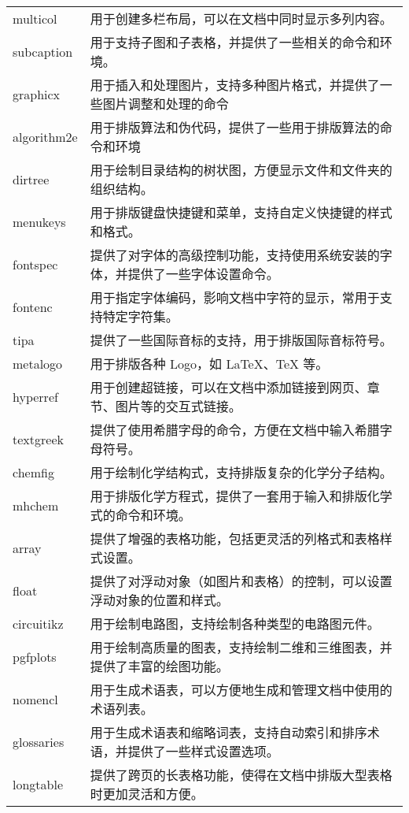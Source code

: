\begin{center}
\begin{longtable}{C{1.8cm}|L{13cm}}
		multicol&用于创建多栏布局，可以在文档中同时显示多列内容。\\
		subcaption&用于支持子图和子表格，并提供了一些相关的命令和环境。\\
		graphicx&用于插入和处理图片，支持多种图片格式，并提供了一些图片调整和处理的命令\\
		algorithm2e&用于排版算法和伪代码，提供了一些用于排版算法的命令和环境\\
		dirtree&用于绘制目录结构的树状图，方便显示文件和文件夹的组织结构。\\
		menukeys&用于排版键盘快捷键和菜单，支持自定义快捷键的样式和格式。\\
		fontspec&提供了对字体的高级控制功能，支持使用系统安装的字体，并提供了一些字体设置命令。\\
		fontenc&用于指定字体编码，影响文档中字符的显示，常用于支持特定字符集。\\
		tipa&提供了一些国际音标的支持，用于排版国际音标符号。\\
		metalogo&用于排版各种 Logo，如 LaTeX、TeX 等。\\
		hyperref&用于创建超链接，可以在文档中添加链接到网页、章节、图片等的交互式链接。\\
		textgreek&提供了使用希腊字母的命令，方便在文档中输入希腊字母符号。\\
		chemfig&用于绘制化学结构式，支持排版复杂的化学分子结构。\\
		mhchem&用于排版化学方程式，提供了一套用于输入和排版化学式的命令和环境。\\
		array&提供了增强的表格功能，包括更灵活的列格式和表格样式设置。\\
		float&提供了对浮动对象（如图片和表格）的控制，可以设置浮动对象的位置和样式。\\
		circuitikz&用于绘制电路图，支持绘制各种类型的电路图元件。\\
		pgfplots&用于绘制高质量的图表，支持绘制二维和三维图表，并提供了丰富的绘图功能。\\
		nomencl&用于生成术语表，可以方便地生成和管理文档中使用的术语列表。\\
		glossaries&用于生成术语表和缩略词表，支持自动索引和排序术语，并提供了一些样式设置选项。\\
		longtable&提供了跨页的长表格功能，使得在文档中排版大型表格时更加灵活和方便。\\
		\hline
	\end{longtable}
\end{center}
